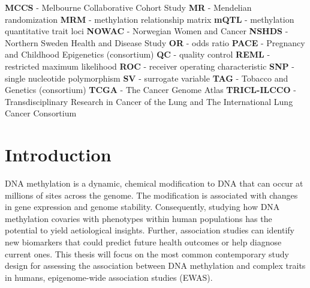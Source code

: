 \documentclass[11pt,oneside]{bristolthesis}
\begin{document}
\begin{abbreviations}
    \textbf{MCCS} - Melbourne Collaborative Cohort Study \newline
    \textbf{MR} - Mendelian randomization \newline
    \textbf{MRM} - methylation relationship matrix \newline
    \textbf{mQTL} - methylation quantitative trait loci \newline
    \textbf{NOWAC} - Norwegian Women and Cancer \newline
    \textbf{NSHDS} - Northern Sweden Health and Disease Study \newline
    \textbf{OR} - odds ratio \newline
    \textbf{PACE} - Pregnancy and Childhood Epigenetics (consortium) \newline
    \textbf{QC} - quality control \newline
    \textbf{REML} - restricted maximum likelihood \newline
    \textbf{ROC} - receiver operating characteristic \newline
    \textbf{SNP} - single nucleotide polymorphism \newline
    \textbf{SV} - surrogate variable \newline
    \textbf{TAG} - Tobacco and Genetics (consortium) \newline
    \textbf{TCGA} - The Cancer Genome Atlas \newline
    \textbf{TRICL-ILCCO} - Transdisciplinary Research in Cancer of the Lung and The International Lung Cancer Consortium \newline
  \end{abbreviations}
\mainmatter %
\pagestyle{plain}
\hypertarget{introduction}{%
\chapter{Introduction}\label{introduction}}

DNA methylation is a dynamic, chemical modification to DNA that can occur at millions of sites across the genome. The modification is associated with changes in gene expression and genome stability. Consequently, studying how DNA methylation covaries with phenotypes within human populations has the potential to yield aetiological insights. Further, association studies can identify new biomarkers that could predict future health outcomes or help diagnose current ones. This thesis will focus on the most common contemporary study design for assessing the association between DNA methylation and complex traits in humans, epigenome-wide association studies (EWAS).
\end{document}
